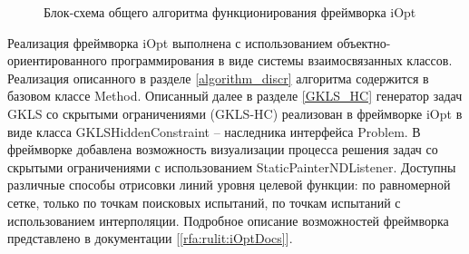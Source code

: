 \documentclass[a4paper,12pt,russian]{article}
\begin{document}
\begin{figure}[h!]
	\caption{Блок-схема общего алгоритма функционирования фреймворка iOpt}
	\label{fig_iOpt}
\end{figure}

Реализация фреймворка iOpt выполнена с использованием объектно-ориентированного программирования в виде системы взаимосвязанных классов. Реализация описанного в разделе \ref{algorithm_discr} алгоритма содержится в базовом классе Method. Описанный далее в разделе \ref{GKLS_HC} генератор задач GKLS со скрытыми ограничениями (GKLS-HC) реализован в фреймворке iOpt в виде класса GKLSHiddenConstraint -- наследника интерфейса Problem. В фреймворке добавлена возможность визуализации процесса решения задач со скрытыми ограничениями с использованием StaticPainterNDListener. Доступны различные способы отрисовки линий уровня целевой функции: по равномерной сетке, только по точкам поисковых испытаний, по точкам испытаний с использованием интерполяции. Подробное описание возможностей фреймворка представлено в документации [\ref{rfa:rulit:iOptDocs}].
\end{document}
